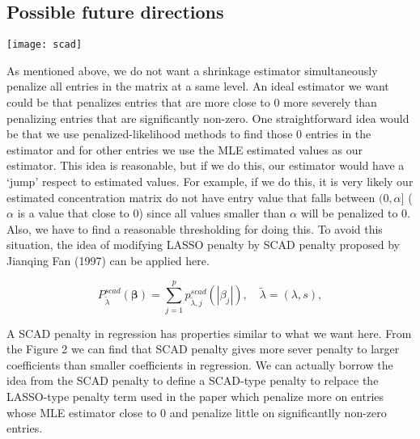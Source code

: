 \subsection*{Possible future directions}

\begin{center}
\texttt{[image: scad]}
\end{center}

As mentioned above, we do not want a shrinkage estimator simultaneously penalize all entries in the matrix at a same level.  An ideal estimator we want could be that penalizes entries that are more close to 0 more severely than penalizing entries that are significantly non-zero.  One straightforward idea would be that we use penalized-likelihood methods to find those 0 entries in the estimator and for other entries we use the MLE estimated values as our estimator.  This idea is reasonable, but if we do this, our estimator would have a `jump' respect to estimated values.  For example, if we do this, it is very likely our estimated concentration matrix do not have entry value that falls between $(0, \alpha]$ ($\alpha$ is a value that close to 0) since all values smaller than $\alpha$ will be penalized to 0.  Also, we have to find a reasonable thresholding for doing this.  To avoid this situation, the idea of modifying LASSO penalty by SCAD penalty proposed by Jianqing Fan (1997) can be applied here.

$$P_{\tilde{\lambda}}^{scad} (\boldsymbol{\beta}) = ∑_{j=1}^p p_{\tilde{\lambda},j}^{scad} (|\beta_j|), \quad \tilde{\lambda} = (\lambda, s),$$

A SCAD penalty in regression has properties similar to what we want here.  From the Figure 2 we can find that SCAD penalty gives more sever penalty to larger coefficients than smaller coefficients in regression.  We can actually borrow the idea from the SCAD penalty to define a SCAD-type penalty to relpace the LASSO-type penalty term used in the paper which penalize more on entries whose MLE estimator close to 0 and penalize little on significantlly non-zero entries.